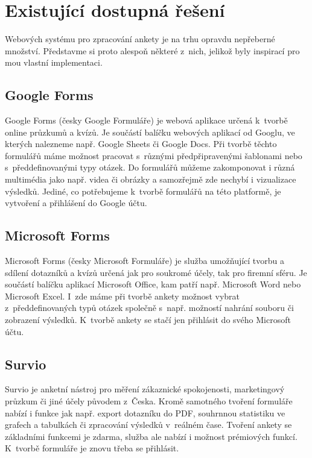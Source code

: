 \chapter{Existující dostupná řešení}

Webových systému pro zpracování ankety je na trhu opravdu nepřeberné množství. Představme si proto alespoň některé z~nich, jelikož byly inspirací pro mou vlastní implementaci.

\section{Google Forms}

Google Forms (česky Google Formuláře) je webová aplikace určená k~tvorbě online průzkumů a kvízů. Je součástí balíčku webových aplikací od Googlu, ve kterých nalezneme např. Google Sheets či Google Docs. Při tvorbě těchto formulářů máme možnost pracovat s~různými předpřipravenými šablonami nebo s~předdefinovanými typy otázek. Do formulářů můžeme zakomponovat i různá multimédia jako např. videa či obrázky a samozřejmě zde nechybí i vizualizace výsledků. Jediné, co potřebujeme k~tvorbě formulářů na této platformě, je vytvoření a přihlášení do Google účtu. \cite{GoogleForms1}\cite{GoogleForms2}

\section{Microsoft Forms}
Microsoft Forms (česky Microsoft Formuláře) je služba umožňující tvorbu a sdílení dotazníků a kvízů určená jak pro soukromé účely, tak pro firemní sféru. Je součástí balíčku aplikací Microsoft Office, kam patří např. Microsoft Word nebo Microsoft Excel. I~zde máme při tvorbě ankety možnost vybrat z~předdefinovaných typů otázek společně s~např. možností nahrání souboru či zobrazení výsledků. K~tvorbě ankety se stačí jen přihlásit do svého Microsoft účtu. \cite{MSForms1}\cite{MSForms2}

\section{Survio}
Survio je anketní nástroj pro měření zákaznické spokojenosti, marketingový průzkum či jiné účely původem z~Česka. Kromě samotného tvoření formuláře nabízí i funkce jak např. export dotazníku do PDF, souhrnnou statistiku ve grafech a tabulkách či zpracování výsledků v~reálném čase. Tvoření ankety se základními funkcemi je zdarma, služba ale nabízí i možnost prémiových funkcí. K~tvorbě formuláře je znovu třeba se přihlásit. \cite{Survio}


